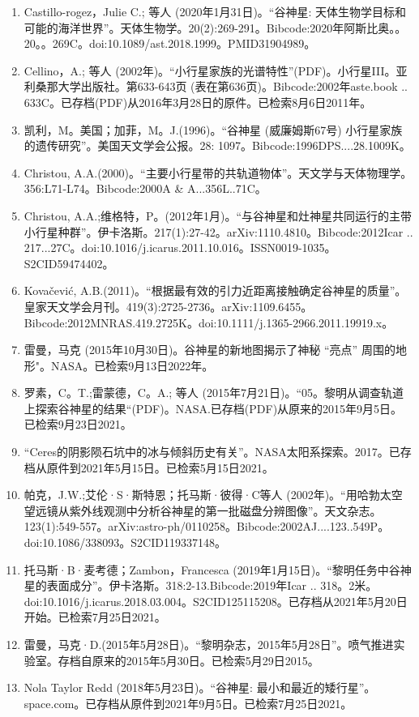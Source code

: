 \begin{enumerate}
\item Castillo-rogez，Julie C.; 等人 (2020年1月31日)。“谷神星: 天体生物学目标和可能的海洋世界”。天体生物学。20(2):269-291。Bibcode:2020年阿斯比奥。。20。。269C。doi:10.1089/ast.2018.1999。PMID31904989。 
\item Cellino，A.; 等人 (2002年)。“小行星家族的光谱特性”(PDF)。小行星III。亚利桑那大学出版社。第633-643页 (表在第636页)。Bibcode:2002年aste.book .. 633C。已存档(PDF)从2016年3月28日的原件。已检索8月6日2011年。
\item 凯利，M。美国；加菲，M。J.(1996)。“谷神星 (威廉姆斯67号) 小行星家族的遗传研究”。美国天文学会公报。28: 1097。Bibcode:1996DPS....28.1009K。
\item Christou, A.A.(2000)。“主要小行星带的共轨道物体”。天文学与天体物理学。356:L71-L74。Bibcode:2000A & A...356L..71C。
\item Christou, A.A.;维格特，P。(2012年1月)。“与谷神星和灶神星共同运行的主带小行星种群”。伊卡洛斯。217(1):27-42。arXiv:1110.4810。Bibcode:2012Icar .. 217...27C。doi:10.1016/j.icarus.2011.10.016。ISSN0019-1035。S2CID59474402。  
\item Kovačević, A.B.(2011)。“根据最有效的引力近距离接触确定谷神星的质量”。皇家天文学会月刊。419(3):2725-2736。arXiv:1109.6455。Bibcode:2012MNRAS.419.2725K。doi:10.1111/j.1365-2966.2011.19919.x。
\item 雷曼，马克 (2015年10月30日)。谷神星的新地图揭示了神秘 “亮点” 周围的地形"。NASA。已检索9月13日2022年。
\item 罗素，C。T.;雷蒙德，C。A.; 等人 (2015年7月21日)。“05。黎明从调查轨道上探索谷神星的结果“(PDF)。NASA.已存档(PDF)从原来的2015年9月5日。已检索9月23日2021。
\item “Ceres的阴影陨石坑中的冰与倾斜历史有关”。NASA太阳系探索。2017。已存档从原件到2021年5月15日。已检索5月15日2021。
\item 帕克，J.W.;艾伦·S·斯特恩；托马斯·彼得·C等人 (2002年)。“用哈勃太空望远镜从紫外线观测中分析谷神星的第一批磁盘分辨图像”。天文杂志。123(1):549-557。arXiv:astro-ph/0110258。Bibcode:2002AJ....123..549P。doi:10.1086/338093。S2CID119337148。 
\item 托马斯·B·麦考德；Zambon，Francesca (2019年1月15日)。“黎明任务中谷神星的表面成分”。伊卡洛斯。318:2-13.Bibcode:2019年Icar .. 318。2米。doi:10.1016/j.icarus.2018.03.004。S2CID125115208。已存档从2021年5月20日开始。已检索7月25日2021。 
\item 雷曼，马克·D.(2015年5月28日)。“黎明杂志，2015年5月28日”。喷气推进实验室。存档自原来的2015年5月30日。已检索5月29日2015。
\item Nola Taylor Redd (2018年5月23日)。“谷神星: 最小和最近的矮行星”。space.com。已存档从原件到2021年9月5日。已检索7月25日2021。

\end{enumerate}
